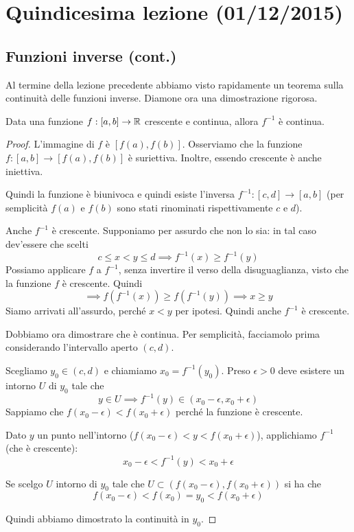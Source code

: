 \chapter{Quindicesima lezione (01/12/2015)}

\section{Funzioni inverse (cont.)}

Al termine della lezione precedente abbiamo visto rapidamente un teorema sulla continuità delle funzioni inverse. Diamone ora una dimostrazione rigorosa.
\begin{theorem}
Data una funzione $f: [a, b] \to \mathbb R$ crescente e continua, allora $f^{-1}$ è continua.
\end{theorem}
\begin{proof}
L'immagine di $f$ è $[f(a), f(b)]$. Osserviamo che la funzione $f: [a, b] \to [f(a), f(b)]$ è suriettiva. Inoltre, essendo crescente è anche iniettiva.

Quindi la funzione è biunivoca e quindi esiste l'inversa $f^{-1}:[c,d] \to [a, b]$ (per semplicità $f(a)$ e $f(b)$ sono stati rinominati rispettivamente $c$ e $d$).

Anche $f^{-1}$ è crescente. Supponiamo per assurdo che non lo sia: in tal caso dev'essere che scelti
\begin{equation*}
c \le x < y \le d \implies f^{-1}(x) \ge f^{-1}(y)
\end{equation*}
Possiamo applicare $f$ a $f^{-1}$, senza invertire il verso della disuguaglianza, visto che la funzione $f$ è crescente. Quindi
\begin{equation*}
\implies f(f^{-1}(x)) \ge f(f^{-1}(y)) \implies x \ge y
\end{equation*}
Siamo arrivati all'assurdo, perché $x < y$ per ipotesi. Quindi anche $f^{-1}$ è crescente.

Dobbiamo ora dimostrare che è continua. Per semplicità, facciamolo prima considerando l'intervallo aperto $(c, d)$. 

Scegliamo $y_0 \in (c,d)$ e chiamiamo $x_0 = f^{-1} (y_0)$. Preso $\epsilon > 0$ deve esistere un intorno $U$ di $y_0$ tale che
\begin{equation*}
y \in U \implies f^{-1} (y) \in (x_0 - \epsilon, x_0 + \epsilon)
\end{equation*}
Sappiamo che $f(x_0 - \epsilon) < f(x_0 + \epsilon)$ perché la funzione è crescente.

Dato $y$ un punto nell'intorno ($f(x_0 - \epsilon) < y < f(x_0 + \epsilon)$), applichiamo $f^{-1}$ (che è crescente):
\begin{equation*}
x_0 - \epsilon < f^{-1} (y) < x_0 + \epsilon
\end{equation*}

Se scelgo $U$ intorno di $y_0$ tale che $U \subset (f(x_0 - \epsilon), f(x_0 + \epsilon))$ si ha che
\begin{equation*}
f(x_0 - \epsilon) < f(x_0) = y_0 < f(x_0 + \epsilon)
\end{equation*}

Quindi abbiamo dimostrato la continuità in $y_0$.
\end{proof}

